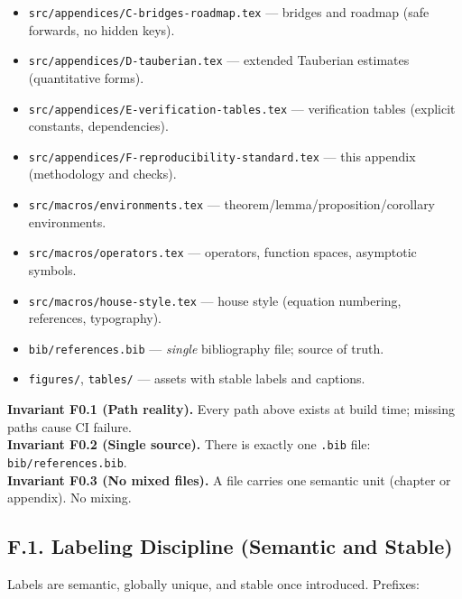 \begin{itemize}
  \item \texttt{src/appendices/C-bridges-roadmap.tex} — bridges and roadmap (safe forwards, no hidden keys).
  \item \texttt{src/appendices/D-tauberian.tex} — extended Tauberian estimates (quantitative forms).
  \item \texttt{src/appendices/E-verification-tables.tex} — verification tables (explicit constants, dependencies).
  \item \texttt{src/appendices/F-reproducibility-standard.tex} — this appendix (methodology and checks).
  \item \texttt{src/macros/environments.tex} — theorem/lemma/proposition/corollary environments.
  \item \texttt{src/macros/operators.tex} — operators, function spaces, asymptotic symbols.
  \item \texttt{src/macros/house-style.tex} — house style (equation numbering, references, typography).
  \item \texttt{bib/references.bib} — \emph{single} bibliography file; source of truth.
  \item \texttt{figures/}, \texttt{tables/} — assets with stable labels and captions.
\end{itemize}

\noindent\textbf{Invariant F0.1 (Path reality).} Every path above exists at build time; missing paths cause CI failure.\\
\textbf{Invariant F0.2 (Single source).} There is exactly one \texttt{.bib} file: \texttt{bib/references.bib}.\\
\textbf{Invariant F0.3 (No mixed files).} A file carries one semantic unit (chapter or appendix). No mixing.


\subsection*{F.1. Labeling Discipline (Semantic and Stable)}

\noindent
Labels are semantic, globally unique, and stable once introduced. Prefixes:

